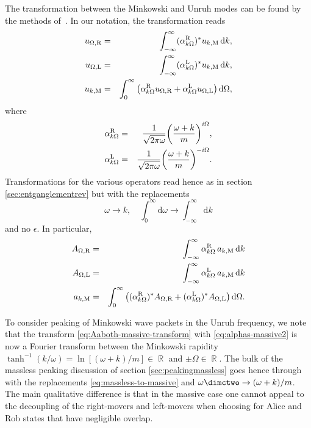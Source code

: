 The transformation between the Minkowski and Unruh modes 
can be found by the methods of~\cite{Takagi}. 
In our notation, the transformation reads 
\begin{eqnarray}
\label{eq:alphas-massive}
u_{\Omega,\text{\text{R}}} &=& \int_{-\infty}^{\infty}(\alpha^\text{\text{R}}_{k\Omega})^{\ast}u_{k,\text{M}} \, \text{d}k , \nonumber \\
u_{\Omega,\text{\text{L}}} &=& \int_{-\infty}^{\infty}(\alpha^\text{\text{L}}_{k\Omega})^{\ast}u_{k,\text{M}} \, \text{d}k , \nonumber \\
u_{k ,\text{M}} &=& \int_{0}^{\infty}
\left(\alpha^\text{\text{R}}_{k\Omega} u_{\Omega,\text{\text{R}}} +\alpha^\text{\text{L}}_{k\Omega} u_{\Omega,\text{\text{L}}} \right)\text{d}\Omega, 
\end{eqnarray}
where
\begin{eqnarray}\label{eq:alphas-massive2}
\alpha^\text{\text{R}}_{k\Omega} &=& 
\frac{1}{\sqrt{2\pi\omega}}
{\left(\frac{\omega+k}{m}\right)}^{i\Omega} ,\nonumber  \\
\alpha^\text{\text{L}}_{k\Omega} &=&
\frac{1}{\sqrt{2\pi\omega}}
{\left(\frac{\omega+k}{m}\right)}^{-i\Omega}.
\end{eqnarray}
Transformations for the various operators read hence as 
in section \ref{sec:entganglementrev}
but with the replacements 
\begin{equation}
\label{eq:massless-to-massive}
\omega\to k, \quad
\int_0^\infty \text{d}\omega \longrightarrow \int_{-\infty}^\infty \text{d}k 
\end{equation}
and no $\epsilon$. In particular, 
\begin{eqnarray}
\label{eq:Aaboth-massive-transform}
A_{\Omega,\text{\text{R}}}&=&\int_{-\infty}^{\infty}  \alpha^\text{\text{R}}_{k\Omega} \, a_{k,\text{M}} \, \text{d}k \nonumber \\
A_{\Omega,\text{\text{L}}} &=& \int_{-\infty}^{\infty}  \alpha^\text{\text{L}}_{k\Omega} \, a_{k,\text{M}} \, \text{d}k  \\
a_{k,\text{M}} &=&  \int_{0}^{\infty}\left((\alpha^\text{\text{R}}_{k\Omega})^{\ast} A_{\Omega,\text{\text{R}}}+(\alpha^\text{\text{L}}_{k\Omega})^{\ast} A_{\Omega,\text{\text{L}}}\right)\text{d}\Omega.\nonumber
\end{eqnarray}

To consider peaking of Minkowski wave packets in the Unruh frequency, 
we note that the transform \eqref{eq:Aaboth-massive-transform} with
\eqref{eq:alphas-massive2} is now a Fourier transform between the
Minkowski rapidity $\tanh^{-1} (k/\omega) = \ln[(\omega+k)/m]\in\BbbR$
and $\pm\Omega\in\BbbR$. The bulk of the massless peaking discussion
of section \ref{sec:peakingmassless}
goes hence through with the replacements
\eqref{eq:massless-to-massive} and $\omega\dimctwo \to
(\omega+k)/m$. The main qualitative difference is that in the massive
case one cannot appeal to the decoupling of the right-movers and
left-movers when choosing for Alice and Rob states that have
negligible overlap.

